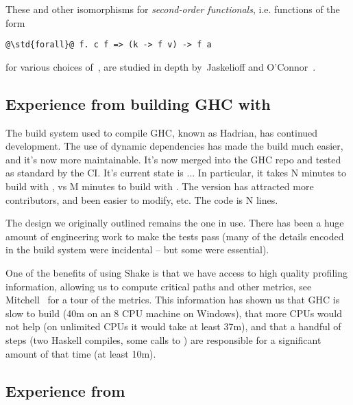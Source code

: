 These and other isomorphisms for \emph{second-order functionals}, i.e.
functions of the form

\vspace{1mm}
\begin{center}
\begin{minipage}{0.5\textwidth}
\begin{verbatim}
@\std{forall}@ f. c f => (k -> f v) -> f a
\end{verbatim}
\end{minipage}
\end{center}
\vspace{1mm}

for various choices of~, are studied in depth by~Jaskelioff and
O’Connor~.

\subsection{Experience from building GHC with \Shake}


The build system used to compile GHC, known as Hadrian, has continued
development. The use of dynamic dependencies has made the build much easier, and
it's now more maintainable. It's now merged into the GHC repo and tested as
standard by the CI. It's current state is ... In particular, it takes N minutes
to build with \Shake, vs M minutes to build with \Make. The \Shake version has
attracted more contributors, and been easier to modify, etc. The code is N
lines.

The design we originally outlined remains the one in use. There has been a huge
amount of engineering work to make the tests pass (many of the details encoded
in the \Make build system were incidental -- but some were essential).

One of the benefits of using Shake is that we have access to high quality
profiling information, allowing us to compute critical paths and other metrics,
see Mitchell~ for a tour of the metrics.
This information has shown us that GHC is slow to build (40m on an 8 CPU machine
on Windows), that more CPUs would not help (on unlimited CPUs it would take at
least 37m), and that a handful of steps (two Haskell compiles, some calls to
) are responsible for a significant amount of that time (at least
10m).

\subsection{Experience from \Cloud \Shake}\label{sec-cloud-shake}

